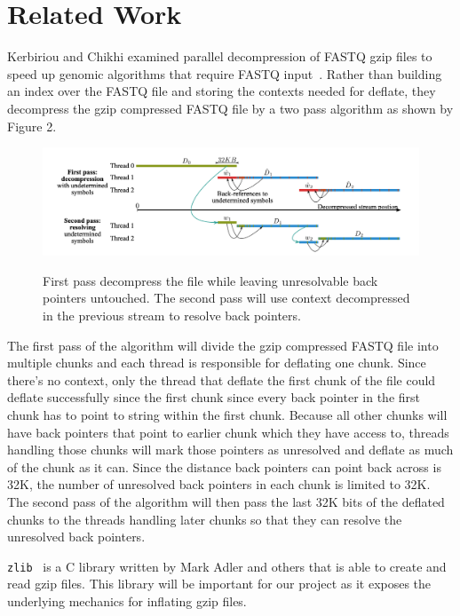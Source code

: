 \documentclass[unnumsec,webpdf,contemporary,large]{oup-authoring-template}
\newcommand{\gzip}{gzip\xspace}
\begin{document}
\section{Related Work}

Kerbiriou and Chikhi examined parallel decompression of FASTQ \gzip files to
speed up genomic algorithms that require FASTQ
input~\cite{kerbiriou2019parallel}. Rather than building an index over the FASTQ file and storing the contexts needed for deflate, they decompress the gzip compressed FASTQ file by a two pass algorithm as shown by Figure 2. 
\begin{figure}[H]
    \includegraphics[scale=0.5]{figs/twopass.png}
    \label{fig:multithread}
    \caption{First pass decompress the file while leaving unresolvable back pointers untouched. The second pass will use context decompressed in the previous stream to resolve back pointers. ~\cite{kerbiriou2019parallel}}
\end{figure}
The first pass of the algorithm will divide the gzip compressed FASTQ file into multiple chunks and each thread is responsible for deflating one chunk. Since there's no context, only the thread that deflate the first chunk of the file could deflate successfully since the first chunk since every back pointer in the first chunk has to point to string within the first chunk. Because all other chunks will have back pointers that point to earlier chunk which they have access to, threads handling those chunks will mark those pointers as unresolved and deflate as much of the chunk as it can. Since the distance back pointers can point back across is 32K, the number of unresolved back pointers in each chunk is limited to 32K.
The second pass of the algorithm will then pass the last 32K bits of the deflated chunks to the threads handling later chunks so that they can resolve the unresolved back pointers. 

\texttt{zlib}~\cite{zlib} is a C library written by Mark Adler and others that
is able to create and read \gzip files. This library will be important for our
project as it exposes the underlying mechanics for inflating \gzip files.
\end{document}
